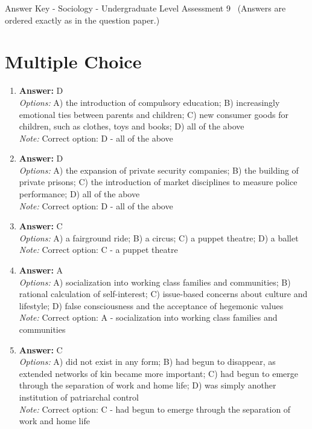 \documentclass[12pt]{article}
\begin{document}
\begin{center}
Answer Key - Sociology - Undergraduate Level Assessment 9 \
\small (Answers are ordered exactly as in the question paper.)
\end{center}

\section*{Multiple Choice}
\begin{enumerate}[label=\arabic*.]
\item \textbf{Answer:} D
\\ \textit{Options:} A) the introduction of compulsory education; B) increasingly emotional ties between parents and children; C) new consumer goods for children, such as clothes, toys and books; D) all of the above
\\ \textit{Note:} Correct option: D - all of the above
\item \textbf{Answer:} D
\\ \textit{Options:} A) the expansion of private security companies; B) the building of private prisons; C) the introduction of market disciplines to measure police performance; D) all of the above
\\ \textit{Note:} Correct option: D - all of the above
\item \textbf{Answer:} C
\\ \textit{Options:} A) a fairground ride; B) a circus; C) a puppet theatre; D) a ballet
\\ \textit{Note:} Correct option: C - a puppet theatre
\item \textbf{Answer:} A
\\ \textit{Options:} A) socialization into working class families and communities; B) rational calculation of self-interest; C) issue-based concerns about culture and lifestyle; D) false consciousness and the acceptance of hegemonic values
\\ \textit{Note:} Correct option: A - socialization into working class families and communities
\item \textbf{Answer:} C
\\ \textit{Options:} A) did not exist in any form; B) had begun to disappear, as extended networks of kin became more important; C) had begun to emerge through the separation of work and home life; D) was simply another institution of patriarchal control
\\ \textit{Note:} Correct option: C - had begun to emerge through the separation of work and home life
\end{enumerate}
\end{document}
